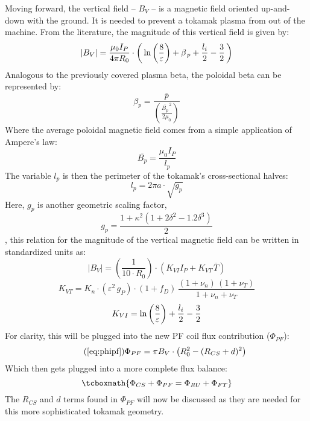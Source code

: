 Moving forward, the vertical field -- $B_V$ -- is a magnetic field oriented up-and-down with the ground. It is needed to prevent a tokamak plasma from  out of the machine. From the literature, the magnitude of this vertical field  is given by:\cite{process}
\begin{equation}
  |B_V| = \frac{\mu_0 I_P}{4 \pi R_0} \cdot \left( \,\textnormal{ln} \left(\frac{8}{\varepsilon}\right) + \beta_{\,p} + \frac{l_i}{2} - \frac{3}{2} \, \right)
\end{equation}
Analogous to the previously covered plasma beta, the poloidal beta can be represented by: \cite{elongation}
\begin{equation}
  \beta_p = \frac{\overline{p}}{\left( \frac{\overline{B_p}^{\,2}}{2 \mu_0} \right)}
\end{equation}
Where the average poloidal magnetic field comes from a simple application of Ampere's law:
\begin{equation}
	\overline{B_p} = \frac{\mu_0 I_P}{l_p}
\end{equation}
The variable $l_p$ is then the perimeter of the tokamak's cross-sectional halves:
\begin{equation}
	l_p = 2 \pi a \cdot \sqrt{g_p}
\end{equation}
Here, $g_p$ is another geometric scaling factor,
\begin{equation}
  g_p = \frac{1 + \kappa^2 ( 1 + 2 \delta^2 - 1.2\delta^3 )}{2}
\end{equation}
, this relation for the magnitude of the vertical magnetic field can be written in standardized units as:
\begin{equation}
	|B_V| = \left( \frac{ 1 }{ 10 \cdot R_0} \right) \cdot \left( K_{VI} I_P +  K_{VT\,} \overline{T}  \right)
\end{equation}
\begin{equation}
	K_{VT} = K_{n} \cdot ( \varepsilon ^ 2 \, g_P ) \cdot ( 1 + f_D ) \, \frac{ (1 + \nu_n) \, (1 + \nu_T) }{1 + \nu_n + \nu_T }
\end{equation}
\begin{equation}
	K_{VI} = \textnormal{ln} \left(\frac{8}{\varepsilon}\right) + \frac{l_i}{2} - \frac{3}{2}
\end{equation}
For clarity, this will be plugged into the new PF coil flux contribution ($\Phi_{PF}$):
\begin{equation}
	\tag{\ref{eq:phipf}}
	\Phi_{PF} = \pi B_V \cdot \left( R_0^2 - ( R_{CS} + d ) ^ 2 \right)
\end{equation}
Which then gets plugged into a more complete flux balance:
\begin{equation}
	\label{eq:full_ibal}
	\tcboxmath{
		\Phi_{CS} + \Phi_{PF} = \Phi_{RU} + \Phi_{FT}
	}
\end{equation}
The $R_{CS}$ and $d$ terms found in $\Phi_{PF}$ will now be discussed as they are needed for this more sophisticated tokamak geometry.

